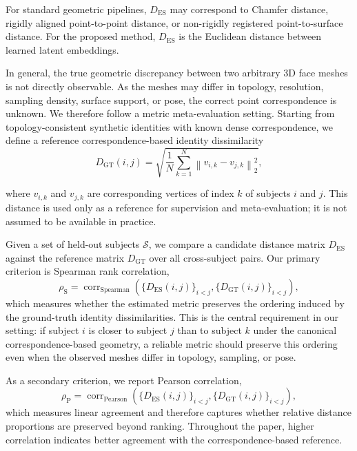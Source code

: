 \documentclass{article}
\begin{document}
For standard geometric pipelines, $D_{\mathrm{ES}}$ may correspond to Chamfer distance, rigidly aligned point-to-point distance, or non-rigidly registered point-to-surface distance. For the proposed method, $D_{\mathrm{ES}}$ is the Euclidean distance between learned latent embeddings.

In general, the true geometric discrepancy between two arbitrary 3D face meshes is not directly observable. As the meshes may differ in topology, resolution, sampling density, surface support, or pose, the correct point correspondence is unknown. We therefore follow a metric meta-evaluation setting. Starting from topology-consistent synthetic identities with known dense correspondence, we define a reference correspondence-based identity dissimilarity
%
\begin{equation}
D_{\mathrm{GT}}(i,j)
=
\sqrt{
\frac{1}{N}
\sum_{k=1}^{N}
\left\|
v_{i,k} - v_{j,k}
\right\|_2^2
}, 
\label{eq:ground_truth_distance}
\end{equation}

where $v_{i,k}$ and $v_{j,k}$ are corresponding vertices of index $k$ of subjects $i$ and $j$. This distance is used only as a reference for supervision and meta-evaluation; it is not assumed to be available in practice.

Given a set of held-out subjects $\mathcal S$, we compare a candidate distance matrix $D_{\mathrm{ES}}$ against the reference matrix $D_{\mathrm{GT}}$ over all cross-subject pairs. Our primary criterion is Spearman rank correlation,
\begin{equation}
\rho_{\mathrm{S}}
=
\operatorname{corr}_{\mathrm{Spearman}}
\left(
\{D_{\mathrm{ES}}(i,j)\}_{i<j},
\{D_{\mathrm{GT}}(i,j)\}_{i<j}
\right), 
\label{eq:spearman_correlation}
\end{equation}
which measures whether the estimated metric preserves the ordering induced by the ground-truth identity dissimilarities. This is the central requirement in our setting: if subject $i$ is closer to subject $j$ than to subject $k$ under the canonical correspondence-based geometry, a reliable metric should preserve this ordering even when the observed meshes differ in topology, sampling, or pose.

As a secondary criterion, we report Pearson correlation,
\begin{equation}
\rho_{\mathrm{P}}
=
\operatorname{corr}_{\mathrm{Pearson}}
\left(
\{D_{\mathrm{ES}}(i,j)\}_{i<j},
\{D_{\mathrm{GT}}(i,j)\}_{i<j}
\right), 
\label{eq:pearson_correlation}
\end{equation}
which measures linear agreement and therefore captures whether relative distance proportions are preserved beyond ranking. Throughout the paper, higher correlation indicates better agreement with the correspondence-based reference.
\end{document}
